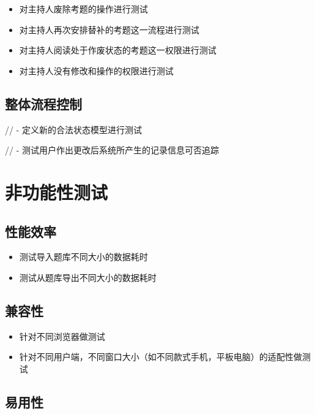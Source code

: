 \documentclass[hyperref, a4paper]{ctexart}
\providecommand{\tightlist}{%
  \setlength{\itemsep}{0pt}\setlength{\parskip}{0pt}}
\begin{document}
\begin{itemize}
\tightlist
\item
  对主持人废除考题的操作进行测试
\item
  对主持人再次安排替补的考题这一流程进行测试
\item
  对主持人阅读处于作废状态的考题这一权限进行测试
\item
  对主持人没有修改和操作的权限进行测试
\end{itemize}

\hypertarget{ux6574ux4f53ux6d41ux7a0bux63a7ux5236}{%
\subsection{整体流程控制}\label{ux6574ux4f53ux6d41ux7a0bux63a7ux5236}}

// - 定义新的合法状态模型进行测试

// - 测试用户作出更改后系统所产生的记录信息可否追踪

\hypertarget{ux975eux529fux80fdux6027ux6d4bux8bd5}{%
\section{非功能性测试}\label{ux975eux529fux80fdux6027ux6d4bux8bd5}}

\hypertarget{ux6027ux80fdux6548ux7387}{%
\subsection{性能效率}\label{ux6027ux80fdux6548ux7387}}

\begin{itemize}
\tightlist
\item
  测试导入题库不同大小的数据耗时
\item
  测试从题库导出不同大小的数据耗时
\end{itemize}

\hypertarget{ux517cux5bb9ux6027}{%
\subsection{兼容性}\label{ux517cux5bb9ux6027}}

\begin{itemize}
\tightlist
\item
  针对不同浏览器做测试
\item
  针对不同用户端，不同窗口大小（如不同款式手机，平板电脑）的适配性做测试
\end{itemize}

\hypertarget{ux6613ux7528ux6027}{%
\subsection{易用性}\label{ux6613ux7528ux6027}}
\end{document}
